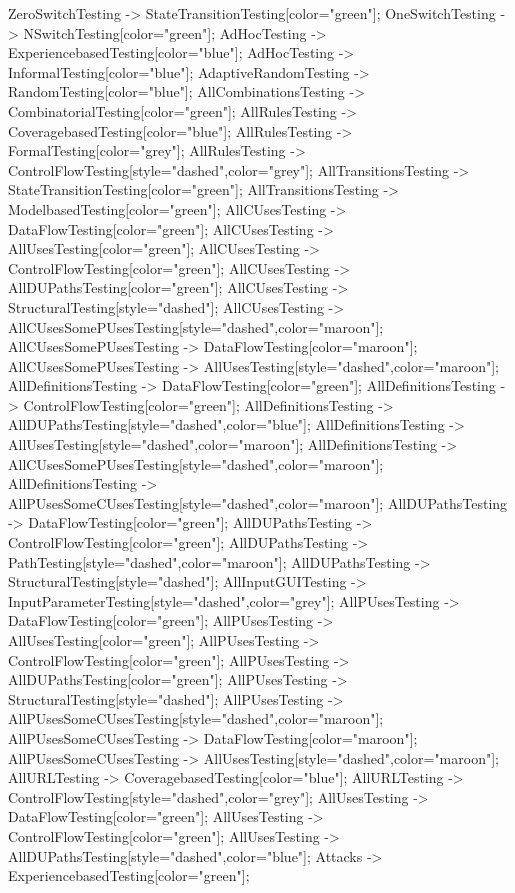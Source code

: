 \documentclass{article}
\begin{document}
{ZeroSwitchTesting -> StateTransitionTesting[color="green"];
OneSwitchTesting -> NSwitchTesting[color="green"];
AdHocTesting -> ExperiencebasedTesting[color="blue"];
AdHocTesting -> InformalTesting[color="blue"];
AdaptiveRandomTesting -> RandomTesting[color="blue"];
AllCombinationsTesting -> CombinatorialTesting[color="green"];
AllRulesTesting -> CoveragebasedTesting[color="blue"];
AllRulesTesting -> FormalTesting[color="grey"];
AllRulesTesting -> ControlFlowTesting[style="dashed",color="grey"];
AllTransitionsTesting -> StateTransitionTesting[color="green"];
AllTransitionsTesting -> ModelbasedTesting[color="green"];
AllCUsesTesting -> DataFlowTesting[color="green"];
AllCUsesTesting -> AllUsesTesting[color="green"];
AllCUsesTesting -> ControlFlowTesting[color="green"];
AllCUsesTesting -> AllDUPathsTesting[color="green"];
AllCUsesTesting -> StructuralTesting[style="dashed"];
AllCUsesTesting -> AllCUsesSomePUsesTesting[style="dashed",color="maroon"];
AllCUsesSomePUsesTesting -> DataFlowTesting[color="maroon"];
AllCUsesSomePUsesTesting -> AllUsesTesting[style="dashed",color="maroon"];
AllDefinitionsTesting -> DataFlowTesting[color="green"];
AllDefinitionsTesting -> ControlFlowTesting[color="green"];
AllDefinitionsTesting -> AllDUPathsTesting[style="dashed",color="blue"];
AllDefinitionsTesting -> AllUsesTesting[style="dashed",color="maroon"];
AllDefinitionsTesting -> AllCUsesSomePUsesTesting[style="dashed",color="maroon"];
AllDefinitionsTesting -> AllPUsesSomeCUsesTesting[style="dashed",color="maroon"];
AllDUPathsTesting -> DataFlowTesting[color="green"];
AllDUPathsTesting -> ControlFlowTesting[color="green"];
AllDUPathsTesting -> PathTesting[style="dashed",color="maroon"];
AllDUPathsTesting -> StructuralTesting[style="dashed"];
AllInputGUITesting -> InputParameterTesting[style="dashed",color="grey"];
AllPUsesTesting -> DataFlowTesting[color="green"];
AllPUsesTesting -> AllUsesTesting[color="green"];
AllPUsesTesting -> ControlFlowTesting[color="green"];
AllPUsesTesting -> AllDUPathsTesting[color="green"];
AllPUsesTesting -> StructuralTesting[style="dashed"];
AllPUsesTesting -> AllPUsesSomeCUsesTesting[style="dashed",color="maroon"];
AllPUsesSomeCUsesTesting -> DataFlowTesting[color="maroon"];
AllPUsesSomeCUsesTesting -> AllUsesTesting[style="dashed",color="maroon"];
AllURLTesting -> CoveragebasedTesting[color="blue"];
AllURLTesting -> ControlFlowTesting[style="dashed",color="grey"];
AllUsesTesting -> DataFlowTesting[color="green"];
AllUsesTesting -> ControlFlowTesting[color="green"];
AllUsesTesting -> AllDUPathsTesting[style="dashed",color="blue"];
Attacks -> ExperiencebasedTesting[color="green"];
}
\end{document}
